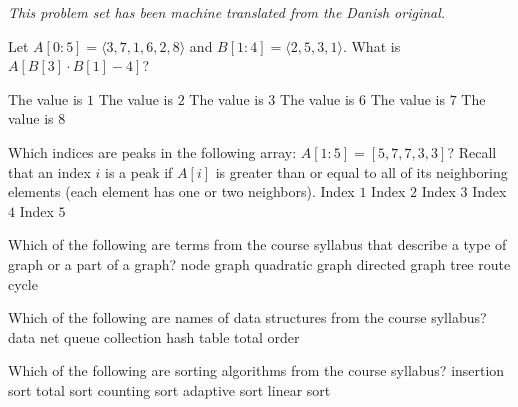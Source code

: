 \noindent\emph{This problem set has been machine translated from the Danish original.}
\medskip

\multiplechoicestart


Let \(A[0:5] = \langle 3, 7, 1, 6, 2, 8 \rangle\) and \(B[1:4] = \langle 2, 5, 3, 1 \rangle\).
What is \(A[B[3] \cdot B[1] - 4]\)?
\oneanswer

\optionsstart
\answer The value is \(1\) \correct
\answer The value is \(2\)
\answer The value is \(3\)
\answer The value is \(6\)
\answer The value is \(7\)
\answer The value is \(8\)
\optionsend
{}

Which indices are peaks in the following array: \(A[1:5] = [5,7,7,3,3]\)?
Recall that an index \(i\) is a peak if \(A[i]\) is greater than or equal to all of its neighboring elements (each element has one or two neighbors).
\multipleanswers
\optionsstart
\answer Index \(1\)
\answer Index \(2\) \correct
\answer Index \(3\) \correct
\answer Index \(4\)
\answer Index \(5\) \correct
\optionsend
{}


Which of the following are terms from the course syllabus that describe a type of graph or a part of a graph?
\multipleanswers
\optionsstart
\answer node graph
\answer quadratic graph
\answer directed graph \correct
\answer tree \correct
\answer route
\answer cycle \correct
\optionsend
{}


Which of the following are names of data structures from the course syllabus?
\multipleanswers
\optionsstart
\answer data net
\answer queue \correct
\answer collection
\answer hash table \correct
\answer total order
\optionsend
{}

Which of the following are sorting algorithms from the course syllabus?
\multipleanswers
\optionsstart
\answer insertion sort \correct
\answer total sort
\answer counting sort \correct
\answer adaptive sort
\answer linear sort
\optionsend
{}

